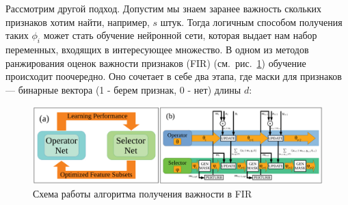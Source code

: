 \documentclass[12pt]{article}
\begin{document}
Рассмотрим другой подход. Допустим мы знаем заранее важность скольких признаков хотим найти, например, $s$ штук. Тогда логичным способом получения таких $\phi_{i}$ может стать обучение нейронной сети, которая выдает нам набор переменных, входящих в интересующее множество. В одном из методов ранжирования оценок важности признаков (FIR) (см.~рис.~\ref{fig:fir}) обучение происходит поочередно.
Оно сочетает в себе два этапа, где маски для признаков --- бинарные вектора (1 - берем признак, 0 - нет) длины $d$:

\begin{figure}[h]
\centering
\includegraphics[width=150mm]{images/FIR.png}
\caption{\label{fig:fir}\centering Схема работы алгоритма получения важности в FIR~\citep{FIR}}
\end{figure}
\end{document}

